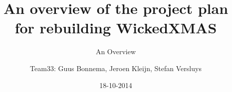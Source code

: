 \documentclass[10pt]{beamer}
\title[Plan]{An overview of the project plan\\ for rebuilding WickedXMAS}
\subtitle[Overview]{An Overview}
\author[Team33]{Team33: Guus Bonnema, Jeroen Kleijn, Stefan Versluys}
\date{18-10-2014}
\institute[OU nl]{Open University The Netherlands}
\begin{document}
\frame{\maketitle}   %




\end{document}
